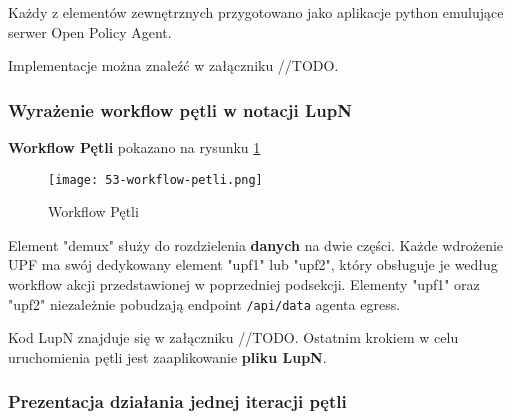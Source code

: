 Każdy z elementów zewnętrznych przygotowano jako aplikacje python emulujące serwer Open Policy Agent.

Implementacje można znaleźć w załączniku //TODO.

\subsubsection{Wyrażenie workflow pętli w notacji LupN}

\textbf{Workflow Pętli} pokazano na rysunku \ref{fig:53-workflow-petli}

\begin{figure}[!h]
    \centering \texttt{[image: 53-workflow-petli.png]}
    \caption{Workflow Pętli}\label{fig:53-workflow-petli}
\end{figure}

Element "demux" służy do rozdzielenia \textbf{danych} na dwie części. Każde wdrożenie UPF ma swój dedykowany element "upf1" lub "upf2", który obsługuje je według workflow akcji przedstawionej w poprzedniej podsekcji. Elementy "upf1" oraz "upf2" niezależnie pobudzają endpoint \texttt{/api/data} agenta egress.

Kod LupN znajduje się w załączniku //TODO. Ostatnim krokiem w celu uruchomienia pętli jest zaaplikowanie \textbf{pliku LupN}. 

\subsubsection{Prezentacja działania jednej iteracji pętli}
